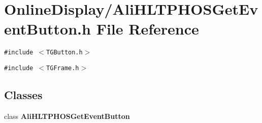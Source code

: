 \section{Online\-Display/Ali\-HLTPHOSGet\-Event\-Button.h File Reference}
\label{AliHLTPHOSGetEventButton_8h}


{\tt \#include $<$TGButton.h$>$}\par
{\tt \#include $<$TGFrame.h$>$}\par
\subsection*{Classes}
\begin{CompactItemize}
\item 
class {\bf Ali\-HLTPHOSGet\-Event\-Button}
\end{CompactItemize}

